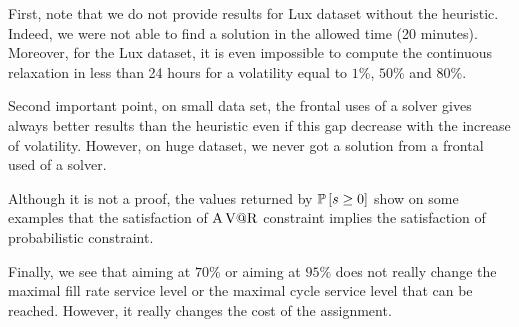 First, note that we do not provide results for Lux dataset without the heuristic.
Indeed, we were not able to find a solution in the allowed time (20 minutes).
Moreover, for the Lux dataset, it is even impossible to compute the continuous relaxation in less than 24 hours for a volatility equal to $1\%$, $50\%$ and $80\%$.


Second important point, on small data set, the frontal uses of a solver gives always better results than the heuristic even if this gap decrease with the increase of volatility.
However, on huge dataset, we never got a solution from a frontal used of a solver.


Although it is not a proof, the values returned by $\prob\sqbracket{s\ge0}$ show on some examples that the satisfaction of $\operatorname{A\operatorname{V@R}}$ constraint implies the satisfaction of probabilistic constraint.


Finally, we see that aiming at $70\%$ or aiming at $95\%$ does not really change the maximal fill rate service level or the maximal cycle service level that can be reached.
However, it really changes the cost of the assignment.




